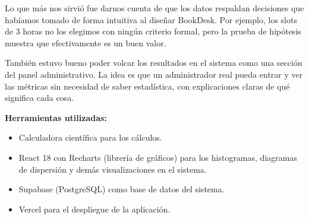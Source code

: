 \documentclass[12pt,a4paper]{article}
\begin{document}
Lo que más nos sirvió fue darnos cuenta de que los datos respaldan decisiones que habíamos tomado de forma intuitiva al diseñar BookDesk. Por ejemplo, los slots de 3 horas no los elegimos con ningún criterio formal, pero la prueba de hipótesis muestra que efectivamente es un buen valor.

También estuvo bueno poder volcar los resultados en el sistema como una sección del panel administrativo. La idea es que un administrador real pueda entrar y ver las métricas sin necesidad de saber estadística, con explicaciones claras de qué significa cada cosa.

\vspace{1cm}
\noindent\textbf{Herramientas utilizadas:}
\begin{itemize}[itemsep=4pt]
  \item Calculadora científica para los cálculos.
  \item React 18 con Recharts (librería de gráficos) para los histogramas, diagramas de dispersión y demás visualizaciones en el sistema.
  \item Supabase (PostgreSQL) como base de datos del sistema.
  \item Vercel para el despliegue de la aplicación.
\end{itemize}
\end{document}
